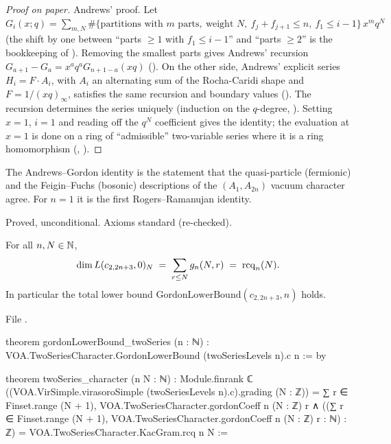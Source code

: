 \begin{proof}[Proof on paper]
Andrews' proof. Let $G_i(x;q)=\sum_{m,N}\#\{\text{partitions with }m\text{ parts},\ \text{weight }N,\ f_j+f_{j+1}\le n,
\ f_1\le i-1\}\,x^mq^N$ (the shift by one between ``parts $\ge1$ with $f_1\le i-1$'' and ``parts $\ge2$'' is the
bookkeeping of ). Removing the smallest parts gives Andrews' recursion
$G_{a+1}-G_a=x^aq^aG_{n+1-a}(xq)$ (). On the other side, Andrews' explicit series
$H_i=F\cdot A_i$, with $A_i$ an alternating sum of the Rocha-Caridi shape and $F=1/(xq)_\infty$, satisfies the same
recursion and boundary values (). The recursion determines the series uniquely (induction on the
$q$-degree, ). Setting $x=1$, $i=1$ and reading off the $q^N$ coefficient gives the identity; the
evaluation at $x=1$ is done on a ring of ``admissible'' two-variable series where it is a ring homomorphism
(, ).
\end{proof}

\begin{physics}
The Andrews--Gordon identity is the statement that the quasi-particle (fermionic) and the Feigin--Fuchs (bosonic)
descriptions of the $(A_1,A_{2n})$ vacuum character agree. For $n=1$ it is the first Rogers--Ramanujan identity.
\end{physics}

\begin{status}
Proved, unconditional. Axioms standard (re-checked).
\end{status}

\begin{theorem}\label{l29:thm:character}
For all $n,N\in{\mathbb{N}}$,
\begin{equation*}
\dim L(c_{2,2n+3},0)_N\;=\;\sum_{r\le N}g_n(N,r)\;=\;\mathrm{rcq}_n(N).
\end{equation*}
In particular the total lower bound $\mathrm{GordonLowerBound}(c_{2,2n+3},n)$ holds.
\end{theorem}

\noindent File .
\begin{leancode}
theorem gordonLowerBound_twoSeries (n : ℕ) :
    VOA.TwoSeriesCharacter.GordonLowerBound (twoSeriesLevels n).c n := by

theorem twoSeries_character (n N : ℕ) :
    Module.finrank ℂ ((VOA.VirSimple.virasoroSimple (twoSeriesLevels n).c).grading (N : ℤ)) =
      ∑ r ∈ Finset.range (N + 1), VOA.TwoSeriesCharacter.gordonCoeff n (N : ℤ) r ∧
    ((∑ r ∈ Finset.range (N + 1), VOA.TwoSeriesCharacter.gordonCoeff n (N : ℤ) r : ℕ) : ℤ) =
      VOA.TwoSeriesCharacter.KacGram.rcq n N :=
\end{leancode}

